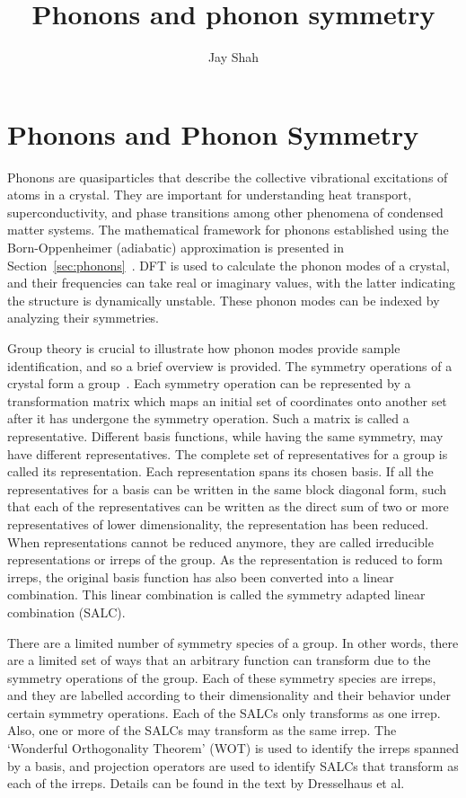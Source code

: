 \documentclass[11pt]{article}
\title{Phonons and phonon symmetry}
\author{Jay Shah}
\date{}
\numberwithin{equation}{section}
\begin{document}
\maketitle

\section{Phonons and Phonon Symmetry}

Phonons are quasiparticles that describe the collective vibrational
excitations of atoms in a crystal. They are important for understanding heat
transport, superconductivity, and phase transitions among other phenomena of
condensed matter systems. The mathematical framework for phonons established
using the Born-Oppenheimer (adiabatic) approximation is presented in
Section~\ref{sec:phonons}~\cite{dove}. DFT is used to calculate the phonon
modes of a crystal, and their frequencies can take real or imaginary values,
with the latter indicating the structure is dynamically unstable. These phonon
modes can be indexed by analyzing their symmetries.

Group theory is crucial to illustrate how phonon modes provide sample
identification, and so a brief overview is provided. The symmetry operations
of a crystal form a group~\cite{dresselhaus}. Each symmetry operation can be
represented by a transformation matrix which maps an initial set of
coordinates onto another set after it has undergone the symmetry operation.
Such a matrix is called a representative. Different basis functions, while
having the same symmetry, may have different representatives. The complete
set of representatives for a group is called its representation. Each
representation spans its chosen basis. If all the representatives for a basis
can be written in the same block diagonal form, such that each of the
representatives can be written as the direct sum of two or more
representatives of lower dimensionality, the representation has been reduced.
When representations cannot be reduced anymore, they are called irreducible
representations or irreps of the group. As the representation is reduced to
form irreps, the original basis function has also been converted into a
linear combination. This linear combination is called the symmetry adapted
linear combination (SALC).

There are a limited number of symmetry species of a group. In other words,
there are a limited set of ways that an arbitrary function can transform due
to the symmetry operations of the group. Each of these symmetry species are
irreps, and they are labelled according to their dimensionality and their
behavior under certain symmetry operations. Each of the SALCs only transforms
as one irrep. Also, one or more of the SALCs may transform as the same irrep.
The `Wonderful Orthogonality Theorem' (WOT) is used to identify the irreps
spanned by a basis, and projection operators are used to identify SALCs that
transform as each of the irreps. Details can be found in the text by
Dresselhaus et al.~\cite{dresselhaus}
\end{document}
